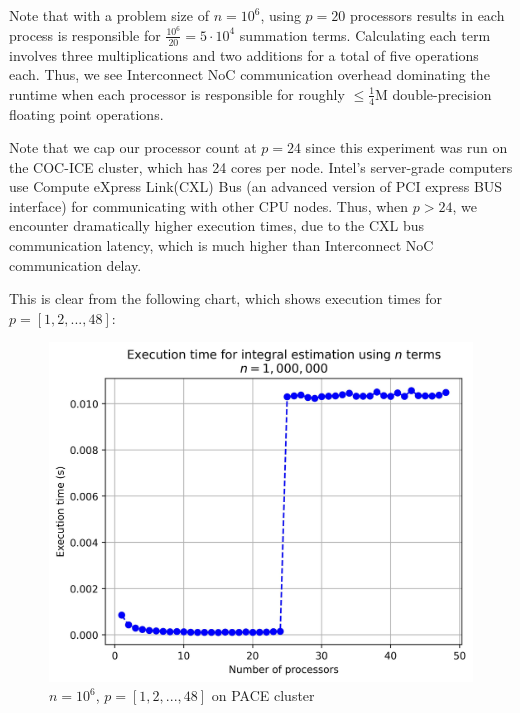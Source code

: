 \documentclass{article}
\begin{document}
Note that with a problem size of $n=10^6$, using $p=20$ processors results in each process is responsible for $\frac{10^6}{20} = 5\cdot 10^4$ summation terms.
Calculating each term involves three multiplications and two additions for a total of five operations each.
Thus, we see Interconnect NoC communication overhead dominating the runtime when each processor is responsible for roughly $\leq \frac{1}{4}$M double-precision floating point operations.

\hbox{}
Note that we cap our processor count at $p=24$ since this experiment was run on the COC-ICE cluster, which has 24 cores per node. Intel's server-grade computers use Compute eXpress Link(CXL) Bus (an advanced version of PCI express BUS interface) for communicating with other CPU nodes. 
Thus, when $p>24$, we encounter dramatically higher execution times, due to the CXL bus communication latency, which is much higher than Interconnect NoC communication delay.

This is clear from the following chart, which shows execution times for  $p=[1,2,...,48]$:

\begin{figure}[htb]
    \centering \includegraphics[scale = 0.75]{report_chart_n_1M_p_48_PACE.jpg}
    \caption{$n=10^6$, $p=[1,2,...,48]$ on PACE cluster}
    \label{fig:figure2}
\end{figure}
\end{document}
